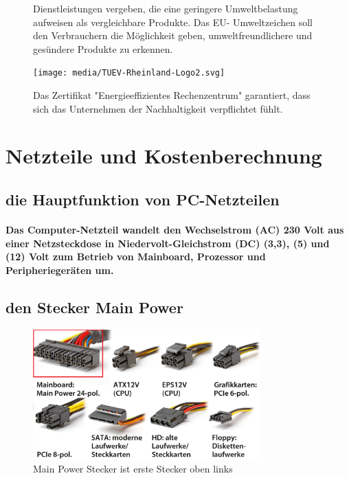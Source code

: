 \documentclass[a4paper]{article}
\begin{document}
\begin{multicols}{2}
\begin{figure}[H]
{                Dienstleistungen vergeben, die eine
                geringere Umweltbelastung aufweisen als
                vergleichbare Produkte. Das EU-
                Umweltzeichen soll den Verbrauchern die
                Möglichkeit geben, umweltfreundlichere und
                gesündere Produkte zu erkennen.}
                \label{fig:ECOLABEL}
            \end{figure}
            \begin{figure}[H]
                \centering
                \texttt{[image: media/TUEV-Rheinland-Logo2.svg]}
                \captionsetup{labelformat=empty}
                \caption{\color{orange}Das Zertifikat "Energieeffizientes
                Rechenzentrum" garantiert, dass sich das
                Unternehmen der Nachhaltigkeit verpflichtet
                fühlt.}
                \label{fig:TUEV}
            \end{figure}
        \end{multicols}
    
    \section{Netzteile und Kostenberechnung}\label{sec:netzteile-und-kostenberechnung}
        \subsection{\color{red}die Hauptfunktion von PC-Netzteilen}\label{subsec:color{red}die-hauptfunktion-von-pc-netzteilen}
        \paragraph{\color{codegreen} Das Computer-Netzteil wandelt den Wechselstrom (AC) 230 Volt aus einer Netzsteckdose in Niedervolt-Gleichstrom (DC) (3,3), (5) und (12) Volt zum Betrieb von Mainboard, Prozessor und Peripheriegeräten um.}
    \subsection{\color{red}den Stecker Main Power}\label{subsec:color{red}den-stecker-main-power}
        \begin{center}
            \begin{figure}[H]
                \centering
                \includegraphics[height=5cm]{media/netzteile}
                \captionsetup{labelformat=empty}
                \caption{\color{orange} Main Power Stecker ist erste Stecker oben links }
                \label{fig:netzteile}
            \end{figure}
        \end{center}
\end{document}
